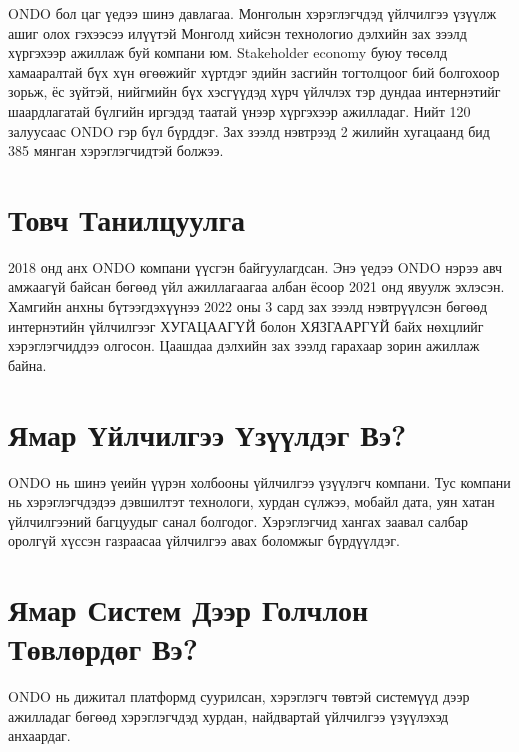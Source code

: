 
ONDO бол цаг үедээ шинэ давлагаа. Монголын хэрэглэгчдэд үйлчилгээ үзүүлж ашиг олох гэхээсээ илүүтэй Монголд хийсэн технологио дэлхийн зах зээлд хүргэхээр ажиллаж буй компани юм. Stakeholder economy буюу төсөлд хамааралтай бүх хүн өгөөжийг хүртдэг эдийн засгийн тогтолцоог бий болгохоор зорьж, ёс зүйтэй, нийгмийн бүх хэсгүүдэд хүрч үйлчлэх тэр дундаа интернэтийг шаардлагатай бүлгийн иргэдэд таатай үнээр хүргэхээр ажилладаг. Нийт 120 залуусаас ONDO гэр бүл бүрддэг. Зах зээлд нэвтрээд 2 жилийн хугацаанд бид 385 мянган хэрэглэгчидтэй болжээ.

\section{Товч Танилцуулга}
2018 онд анх ONDO компани үүсгэн байгуулагдсан. Энэ үедээ ONDO нэрээ авч амжаагүй байсан бөгөөд үйл ажиллагаагаа албан ёсоор 2021 онд явуулж эхлэсэн. Хамгийн анхны бүтээгдэхүүнээ 2022 оны 3 сард зах зээлд нэвтрүүлсэн бөгөөд интернэтийн үйлчилгээг ХУГАЦААГҮЙ болон ХЯЗГААРГҮЙ байх нөхцлийг хэрэглэгчиддээ олгосон. Цаашдаа дэлхийн зах зээлд гарахаар зорин ажиллаж байна.

\section{Ямар Үйлчилгээ Үзүүлдэг Вэ?}
ONDO нь шинэ үеийн үүрэн холбооны үйлчилгээ үзүүлэгч компани. Тус компани нь хэрэглэгчдэдээ дэвшилтэт технологи, хурдан сүлжээ, мобайл дата, уян хатан үйлчилгээний багцуудыг санал болгодог. Хэрэглэгчид хангах заавал салбар оролгүй хүссэн газраасаа үйлчилгээ авах боломжыг бүрдүүлдэг.

\section{Ямар Систем Дээр Голчлон Төвлөрдөг Вэ?}
ONDO нь дижитал платформд суурилсан, хэрэглэгч төвтэй системүүд дээр ажилладаг бөгөөд хэрэглэгчдэд хурдан, найдвартай үйлчилгээ үзүүлэхэд анхаардаг. 
